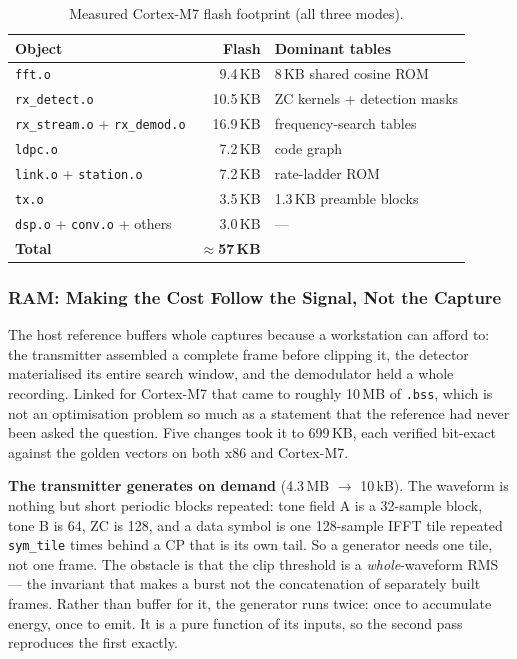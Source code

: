 \begin{table}[H]
    \centering
    \caption{Measured Cortex-M7 flash footprint (all three modes).}
    \label{tab:cport_flash}
    \small
    \begin{tabular}{@{}lrl@{}}
    \toprule
    \textbf{Object} & \textbf{Flash} & \textbf{Dominant tables} \\
    \midrule
    \texttt{fft.o}        & 9.4\,KB  & 8\,KB shared cosine ROM \\
    \texttt{rx\_detect.o} & 10.5\,KB & ZC kernels + detection masks \\
    \texttt{rx\_stream.o} + \texttt{rx\_demod.o} & 16.9\,KB &
                            frequency-search tables \\
    \texttt{ldpc.o}       & 7.2\,KB  & code graph \\
    \texttt{link.o} + \texttt{station.o} & 7.2\,KB & rate-ladder ROM \\
    \texttt{tx.o}         & 3.5\,KB  & 1.3\,KB preamble blocks \\
    \texttt{dsp.o} + \texttt{conv.o} + others & 3.0\,KB & --- \\
    \midrule
    \textbf{Total}        & \textbf{$\approx$57\,KB} & \\
    \bottomrule
    \end{tabular}
\end{table}

\subsubsection{RAM: Making the Cost Follow the Signal, Not the Capture}

The host reference buffers whole captures because a workstation can
afford to: the transmitter assembled a complete frame before clipping
it, the detector materialised its entire search window, and the
demodulator held a whole recording. Linked for Cortex-M7 that came to
roughly 10\,MB of \texttt{.bss}, which is not an optimisation problem so
much as a statement that the reference had never been asked the
question. Five changes took it to 699\,KB, each verified bit-exact
against the golden vectors on both x86 and Cortex-M7.

\textbf{The transmitter generates on demand} (4.3\,MB $\rightarrow$
10\,kB). The waveform is nothing but short periodic blocks repeated:
tone field A is a 32-sample block, tone B is 64, ZC is 128, and a data
symbol is one 128-sample IFFT tile repeated \texttt{sym\_tile} times
behind a CP that is its own tail. So a generator needs one tile, not one
frame. The obstacle is that the clip threshold is a \emph{whole}-waveform
RMS --- the invariant that makes a burst not the concatenation of
separately built frames. Rather than buffer for it, the generator runs
twice: once to accumulate energy, once to emit. It is a pure function of
its inputs, so the second pass reproduces the first exactly.

